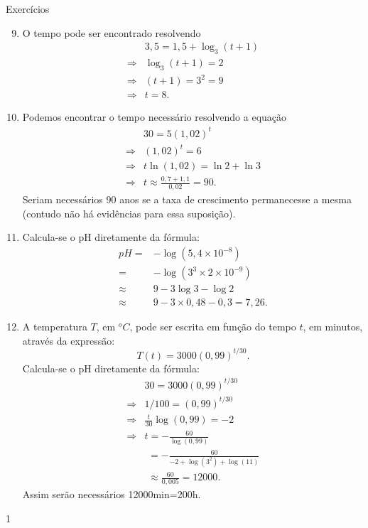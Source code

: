 \begin{answer}{Exercícios}
{\exerciselist
\begin{enumerate}\setcounter{enumi}{8}
\item O tempo pode ser encontrado resolvendo
\begin{align*}
&3{,}5 = 1{,}5+\log_3 (t+1)\\
\Rightarrow & \log_3 (t+1) = 2\\
\Rightarrow & (t+1) = 3^2 =9\\
\Rightarrow & t = 8.
\end{align*}

\item Podemos encontrar o tempo necessário resolvendo a equação
\begin{align*}
& 30 = 5(1{,}02)^t\\
\Rightarrow & (1{,}02)^t = 6\\
\Rightarrow & t\ln(1{,}02) = \ln 2 + \ln 3\\
\Rightarrow & t \approx \frac{0{,}7+1{,}1}{0{,}02}=90.
\end{align*}
Seriam necessários 90 anos se a taxa de crescimento permanecesse a mesma (contudo não há evidências para essa suposição).

\item Calcula-se o pH diretamente da fórmula:
\begin{align*}
pH =& -\log (5{,}4\times 10^{-8})\\
=& -\log (3^3\times 2 \times 10^{-9})\\
\approx& 9-3\log 3 -\log 2 \\
\approx& 9 -3\times 0{,}48 -0{,}3=7{,}26.
\end{align*}

\item A temperatura $T$, em $^oC$, pode ser escrita em função do tempo $t$, em minutos, através da expressão:
$$
T(t) = 3000(0{,}99)^{t/30}.
$$
Calcula-se o pH diretamente da fórmula:
\begin{align*}
&30= 3000(0{,}99)^{t/30}\\
\Rightarrow & 1/100 = (0{,}99)^{t/30}\\
\Rightarrow & \frac{t}{30} \log(0{,}99)= -2\\
\Rightarrow & t= -\frac{60}{\log(0{,}99)} \\
&\,\,= -\frac{60}{-2+\log(3^2)+\log(11)}\\
&\,\,\approx \frac{60}{0{,}005} = 12000.
\end{align*}
Assim serão necessários 12000min=200h.
\end{enumerate}
}{1}
\end{answer}
